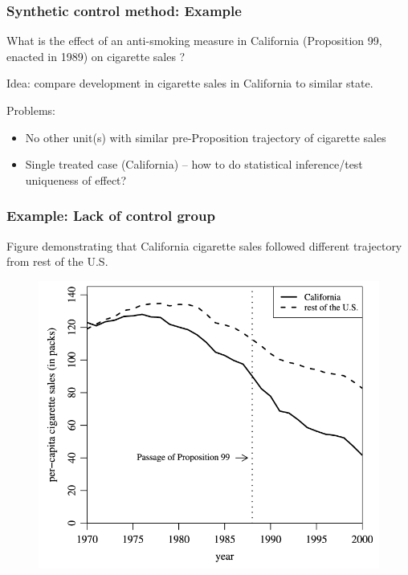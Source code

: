 \documentclass[12pt,english,dvipsnames,aspectratio=169,handout]{beamer}\usepackage[]{graphicx}\usepackage[]{xcolor}
\begin{document}
\begin{frame}
  \frametitle{Synthetic control method: Example}
\footnotesize

What is the effect of an anti-smoking measure in California (Proposition 99, enacted in 1989) on cigarette sales \cite{abadie_synthetic_2010}?

Idea: compare development in cigarette sales in California to similar state.

Problems:
\begin{itemize} 
  \item No other unit(s) with similar pre-Proposition trajectory of cigarette sales
  \item Single treated case (California) -- how to do statistical inference/test uniqueness of effect?
\end{itemize} 

\vspace{1cm}

\end{frame}


\begin{frame}
  \frametitle{Example: Lack of control group}
\footnotesize

Figure demonstrating that California cigarette sales followed different trajectory from rest of the U.S.\

	 \begin{figure} 
    \includegraphics[height=.65\textheight,keepaspectratio=true]{../04-figures/08/06-abadie1}
    \end{figure}

\end{frame}
\end{document}
